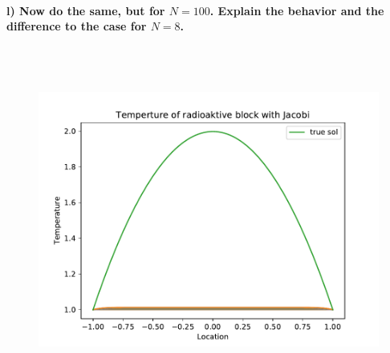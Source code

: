 \newpage
\paragraph{
    l) Now do the same, but for $N=100$. Explain the behavior and the
    difference to the case for $N=8$.
} \ \\
    \\
    \begin{figure}[h!]
        \centering
        \includegraphics[width=.7\textwidth]{../figures/Aufg1l.pdf}
    \end{figure} \ \\

